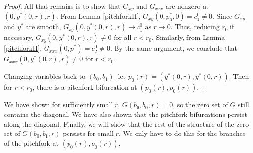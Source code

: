 \documentclass[thesis.tex]{subfiles}
\begin{document}
\begin{lemma}
\begin{proof}
All that remains is to show that $G_{xy}$ and $G_{xxx}$ are nonzero at $(0, y^*(0, r), r)$. From Lemma \ref{pitchforkH}, $G_{xy}(0, p_0^*, 0) = c_1^0 \neq 0$. Since $G_{xy}$ and $y^*$ are smooth, $G_{xy}(0, y^*(0, r), r) \rightarrow c_1^0 \text{ as } r \rightarrow 0$. Thus, reducing $r_0$ if necessary, $G_{xy}(0, y^*(0, r), r) \neq 0$ for all $r < r_0$. Similarly, from Lemma \ref{pitchforkH}, $G_{xxx}(0, p^*) = c_2^0 \neq 0$. By the same argument, we conclude that $G_{xxx}(0, y^*(0, r), r) \neq 0$ for $r < r_0$.

Changing variables back to $(b_0, b_1)$, let $p_0(r) = (y^*(0, r), y^*(0, r))$. Then for $r < r_0$, there is a pitchfork bifurcation at $(p_0(r), p_0(r))$.
\end{proof}
\end{lemma}

We have shown for sufficiently small $r$, $G(b_0, b_0, r) = 0$, so the zero set of $G$ still contains the diagonal. We have also shown that the pitchfork bifurcations persist along the diagonal. Finally, we will show that the rest of the structure of the zero set of $G(b_0, b_1, r)$ persists for small $r$. We only have to do this for the branches of the pitchfork at $(p_0(r), p_0(r))$.
\end{document}
